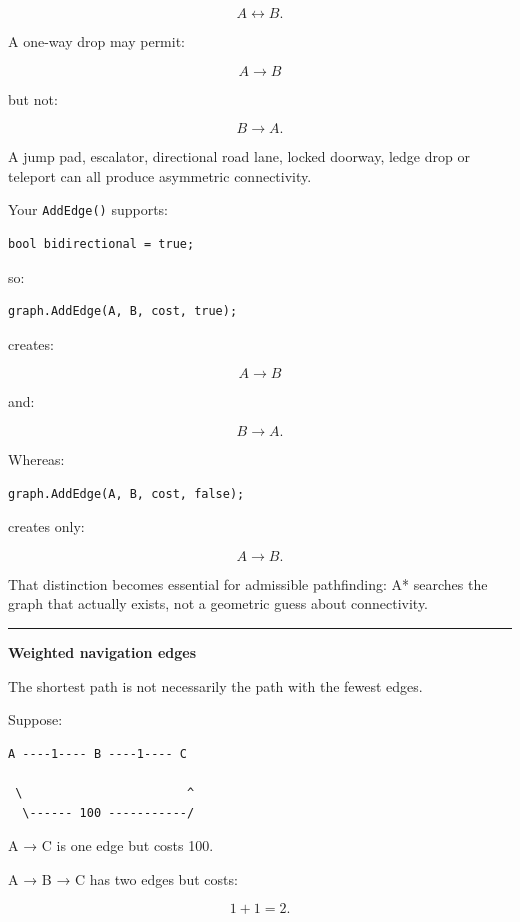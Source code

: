 \[
A\leftrightarrow B.
\]

A one-way drop may permit:

\[
A\rightarrow B
\]

but not:

\[
B\rightarrow A.
\]

A jump pad, escalator, directional road lane, locked doorway, ledge drop or teleport can all produce asymmetric connectivity.

Your \texttt{AddEdge()} supports:

\begin{verbatim}
bool bidirectional = true;
\end{verbatim}

so:

\begin{verbatim}
graph.AddEdge(A, B, cost, true);
\end{verbatim}

creates:

\[
A\rightarrow B
\]

and:

\[
B\rightarrow A.
\]

Whereas:

\begin{verbatim}
graph.AddEdge(A, B, cost, false);
\end{verbatim}

creates only:

\[
A\rightarrow B.
\]

That distinction becomes essential for admissible pathfinding: A* searches the graph that actually exists, not a geometric guess about connectivity.

\begin{center}\rule{0.5\linewidth}{0.5pt}\end{center}

\textbf{Weighted navigation edges}

The shortest path is not necessarily the path with the fewest edges.

Suppose:

\begin{verbatim}
A ----1---- B ----1---- C

 \                       ^
  \------ 100 -----------/
\end{verbatim}

A → C is one edge but costs 100.

A → B → C has two edges but costs:

\[
1+1=2.
\]


